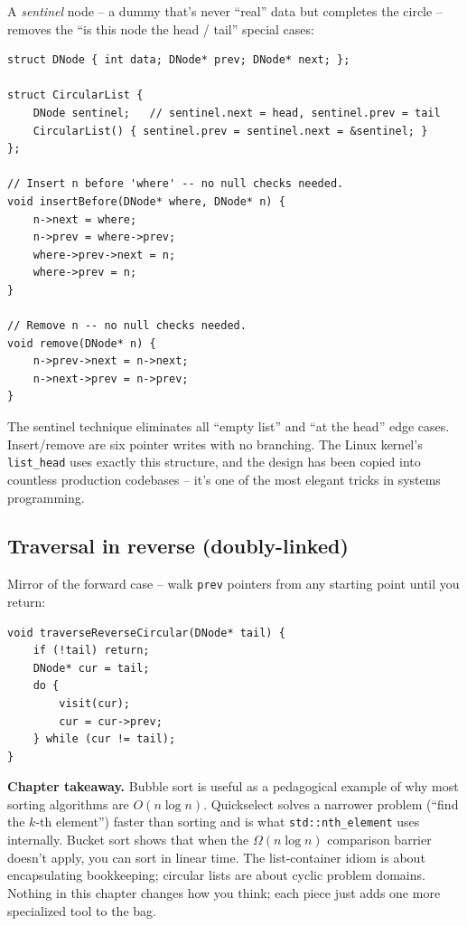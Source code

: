 \documentclass[11pt]{article}
\begin{document}
A \emph{sentinel} node -- a dummy that's never ``real'' data but completes the circle -- removes the ``is this node the head / tail'' special cases:

\begin{lstlisting}[basicstyle=\ttfamily\small,frame=single]
struct DNode { int data; DNode* prev; DNode* next; };

struct CircularList {
    DNode sentinel;   // sentinel.next = head, sentinel.prev = tail
    CircularList() { sentinel.prev = sentinel.next = &sentinel; }
};

// Insert n before 'where' -- no null checks needed.
void insertBefore(DNode* where, DNode* n) {
    n->next = where;
    n->prev = where->prev;
    where->prev->next = n;
    where->prev = n;
}

// Remove n -- no null checks needed.
void remove(DNode* n) {
    n->prev->next = n->next;
    n->next->prev = n->prev;
}
\end{lstlisting}

\begin{ideabox}
The sentinel technique eliminates all ``empty list'' and ``at the head'' edge cases. Insert/remove are six pointer writes with no branching. The Linux kernel's \texttt{list\_head} uses exactly this structure, and the design has been copied into countless production codebases -- it's one of the most elegant tricks in systems programming.
\end{ideabox}

\subsection*{Traversal in reverse (doubly-linked)}

Mirror of the forward case -- walk \texttt{prev} pointers from any starting point until you return:

\begin{lstlisting}[basicstyle=\ttfamily\small,frame=single]
void traverseReverseCircular(DNode* tail) {
    if (!tail) return;
    DNode* cur = tail;
    do {
        visit(cur);
        cur = cur->prev;
    } while (cur != tail);
}
\end{lstlisting}

\begin{ideabox}
\textbf{Chapter takeaway.} Bubble sort is useful as a pedagogical example of why most sorting algorithms are $O(n \log n)$. Quickselect solves a narrower problem (``find the $k$-th element'') faster than sorting and is what \texttt{std::nth\_element} uses internally. Bucket sort shows that when the $\Omega(n \log n)$ comparison barrier doesn't apply, you can sort in linear time. The list-container idiom is about encapsulating bookkeeping; circular lists are about cyclic problem domains. Nothing in this chapter changes how you think; each piece just adds one more specialized tool to the bag.
\end{ideabox}
\end{document}
